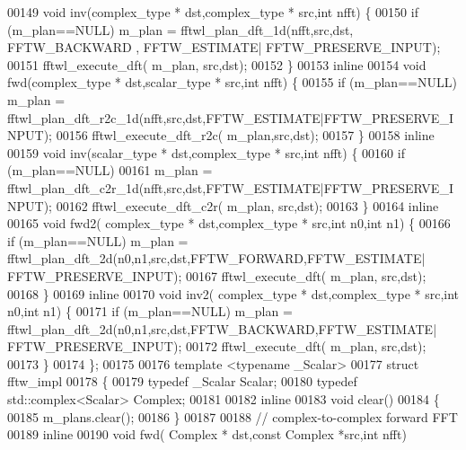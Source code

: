 \begin{DoxyCode}
00149       \textcolor{keywordtype}{void} inv(complex\_type * dst,complex\_type * src,\textcolor{keywordtype}{int} nfft) \{
00150           \textcolor{keywordflow}{if} (m\_plan==NULL) m\_plan = fftwl\_plan\_dft\_1d(nfft,src,dst, FFTW\_BACKWARD , FFTW\_ESTIMATE|
      FFTW\_PRESERVE\_INPUT);
00151           fftwl\_execute\_dft( m\_plan, src,dst);
00152       \}
00153       \textcolor{keyword}{inline}
00154       \textcolor{keywordtype}{void} fwd(complex\_type * dst,scalar\_type * src,\textcolor{keywordtype}{int} nfft) \{
00155           \textcolor{keywordflow}{if} (m\_plan==NULL) m\_plan = fftwl\_plan\_dft\_r2c\_1d(nfft,src,dst,FFTW\_ESTIMATE|FFTW\_PRESERVE\_INPUT);
00156           fftwl\_execute\_dft\_r2c( m\_plan,src,dst);
00157       \}
00158       \textcolor{keyword}{inline}
00159       \textcolor{keywordtype}{void} inv(scalar\_type * dst,complex\_type * src,\textcolor{keywordtype}{int} nfft) \{
00160           \textcolor{keywordflow}{if} (m\_plan==NULL)
00161               m\_plan = fftwl\_plan\_dft\_c2r\_1d(nfft,src,dst,FFTW\_ESTIMATE|FFTW\_PRESERVE\_INPUT);
00162           fftwl\_execute\_dft\_c2r( m\_plan, src,dst);
00163       \}
00164       \textcolor{keyword}{inline} 
00165       \textcolor{keywordtype}{void} fwd2( complex\_type * dst,complex\_type * src,\textcolor{keywordtype}{int} n0,\textcolor{keywordtype}{int} n1) \{
00166           \textcolor{keywordflow}{if} (m\_plan==NULL) m\_plan = fftwl\_plan\_dft\_2d(n0,n1,src,dst,FFTW\_FORWARD,FFTW\_ESTIMATE|
      FFTW\_PRESERVE\_INPUT);
00167           fftwl\_execute\_dft( m\_plan, src,dst);
00168       \}
00169       \textcolor{keyword}{inline} 
00170       \textcolor{keywordtype}{void} inv2( complex\_type * dst,complex\_type * src,\textcolor{keywordtype}{int} n0,\textcolor{keywordtype}{int} n1) \{
00171           \textcolor{keywordflow}{if} (m\_plan==NULL) m\_plan = fftwl\_plan\_dft\_2d(n0,n1,src,dst,FFTW\_BACKWARD,FFTW\_ESTIMATE|
      FFTW\_PRESERVE\_INPUT);
00172           fftwl\_execute\_dft( m\_plan, src,dst);
00173       \}
00174   \};
00175 
00176   \textcolor{keyword}{template} <\textcolor{keyword}{typename} \_Scalar>
00177   \textcolor{keyword}{struct }fftw\_impl
00178   \{
00179       \textcolor{keyword}{typedef} \_Scalar Scalar;
00180       \textcolor{keyword}{typedef} std::complex<Scalar> Complex;
00181 
00182       \textcolor{keyword}{inline}
00183       \textcolor{keywordtype}{void} clear() 
00184       \{
00185         m\_plans.clear();
00186       \}
00187 
00188       \textcolor{comment}{// complex-to-complex forward FFT}
00189       \textcolor{keyword}{inline}
00190       \textcolor{keywordtype}{void} fwd( Complex * dst,\textcolor{keyword}{const} Complex *src,\textcolor{keywordtype}{int} nfft)

\end{DoxyCode}
